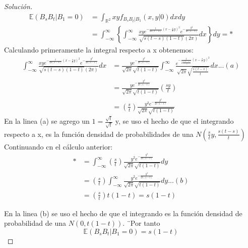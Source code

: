 \documentclass[11pt,notitlepage]{article}
\newenvironment{solucion}
  {\begin{proof}[Solución]}
  {\end{proof}}
\begin{document}
\begin{solucion}
\begin{align*}
    \mathbb{E}(B_sB_t|B_1 = 0) &=\int_{\mathbb{R}^2}xyf_{B_sB_t|B_1}(x,y|0)dxdy \\ 
                               &=\int_{-\infty}^{\infty}\left\{\int_{-\infty}^{\infty}\frac{xye^{-\frac{t}{2s(t-s)}\left(x -  \frac{s}{t}y\right)^2}e^{-\frac{y^2}{2t(1-t)}}}{\sqrt{s(t-s)(1-t)}(2\pi)}dx\right\}dy=*
\end{align*}
Calculando primeramente la integral respecto a x obtenemos: 
\begin{align*}
    \int_{-\infty}^{\infty}\frac{xye^{-\frac{t}{2s(t-s)}\left(x -  \frac{s}{t}y\right)^2}e^{-\frac{y^2}{2t(1-t)}}}{\sqrt{s(t-s)(1-t)}(2\pi)}dx 
    &=\frac{ye^{-\frac{y^2}{2t(1-t)}}}{\sqrt{2\pi}\sqrt{t(1-t)}}\int_{-\infty}^{\infty}\frac{e^{-\frac{1}{2\frac{s(t-s)}{t}}\left(x -  \frac{s}{t}y\right)^2}}{\sqrt{2\pi}\sqrt{\frac{s(t-s)}{t}}}dx...(a)\\
    &=\frac{ye^{-\frac{y^2}{2t(1-t)}}}{\sqrt{2\pi}\sqrt{t(1-t)}}\left(\frac{sy}{t}\right)\\
    &=\left(\frac{s}{t}\right)\frac{y^{2}e^{-\frac{y^2}{2t(1-t)}}}{\sqrt{2\pi}\sqrt{t(1-t)}}
\end{align*}
En la linea (a) se agrego un \(1 = \frac{\sqrt{t}}{\sqrt{t}}\) y, se uso el hecho de que el integrando respecto a x, es la función densidad de probabilidades
de una \(N\left(\frac{s}{t}y,\frac{s(t-s)}{t}\right)\)
Continuando cn el cálculo anterior: 
\begin{align*}
    *&= \int_{-\infty}^{\infty} \left(\frac{s}{t}\right)\frac{y^{2}e^{-\frac{y^2}{2t(1-t)}}}{\sqrt{2\pi}\sqrt{t(1-t)}} dy \\
     &=  \left(\frac{s}{t}\right)\int_{-\infty}^{\infty}\frac{y^{2}e^{-\frac{y^2}{2t(1-t)}}}{\sqrt{2\pi}\sqrt{t(1-t)}} dy...(b)\\
     &=  \left(\frac{s}{t}\right)t(1-t) = s(1-t) 
\end{align*}

En la linea (b) se uso el hecho de que el integrando es la función densidad de probabilidad de una \(N(0,t(1-t))\). 
¨Por tanto
\[
 \mathbb{E}(B_sB_t|B_1 = 0) = s(1-t)
\]
\end{solucion}
\end{document}
